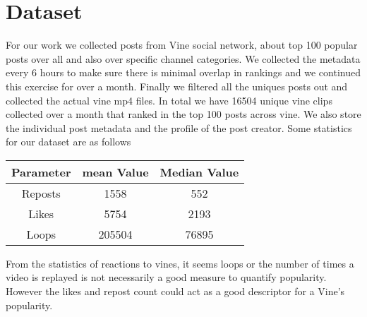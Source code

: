 \section{Dataset}
For our work we collected posts from Vine social network, about top 100 popular posts over all and also over specific channel categories. We collected the metadata every 6 hours to make sure there is minimal overlap in rankings and we continued this exercise for over a month. Finally we filtered all the uniques posts out and collected the actual vine mp4 files. In total we have 16504 unique vine clips collected over a month that ranked in the top 100 posts across vine. We also store the individual post metadata and the profile of the post creator. Some statistics for our dataset are as follows 
\par
\begin{center}
\begin{tabular}{ |c|c|c| } 
 \hline
 Parameter & mean Value & Median Value \\ 
 \hline
 Reposts & 1558 & 552 \\ 
 Likes & 5754 & 2193 \\ 
 Loops & 205504 & 76895 \\ 
 \hline
\end{tabular}
\end{center}
\par
From the statistics of reactions to vines, it seems loops or the number of times a video is replayed is not necessarily a good measure to quantify popularity. However the likes and repost count could act as a good descriptor for a Vine's popularity. 

